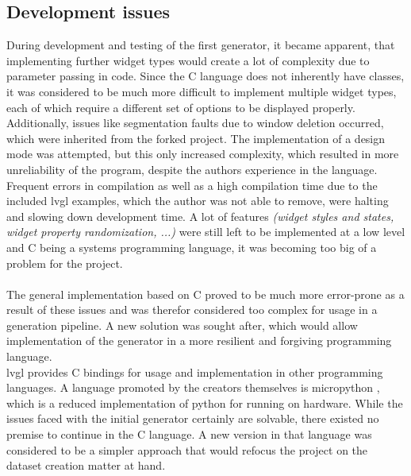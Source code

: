 \documentclass[Bachelor, BIC, english, fhCitStyle, IEEE]{BASE/twbook} %
\begin{document}
\subsection{Development issues}
During development and testing of the first generator, it became apparent, that implementing further widget types would create a lot of complexity due to parameter passing in code. Since the C language does not inherently have classes, it was considered to be much more difficult to implement multiple widget types, each of which require a different set of options to be displayed properly.\\
Additionally, issues like segmentation faults due to window deletion occurred, which were inherited from the forked project. The implementation of a design mode was attempted, but this only increased complexity, which resulted in more unreliability of the program, despite the authors experience in the language. Frequent errors in compilation as well as a high compilation time due to the included \ac{lvgl} examples, which the author was not able to remove, were halting and slowing down development time. A lot of features \textit{(widget styles and states, widget property randomization, ...)} were still left to be implemented at a low level and C being a systems programming language, it was becoming too big of a problem for the project.\\\\
The general implementation based on C proved to be much more error-prone as a result of these issues and was therefor considered too complex for usage in a generation pipeline. A new solution was sought after, which would allow implementation of the generator in a more resilient and forgiving programming language.\\
\ac{lvgl} provides C bindings \autocite{LvglLv_binding_micropythonLVGL} for usage and implementation in other programming languages. A language promoted by the creators themselves is micropython \autocite{LvglLv_micropythonMicropython}, which is a reduced implementation of python for running on hardware. While the issues faced with the initial generator certainly are solvable, there existed no premise to continue in the C language. A new version in that language was considered to be a simpler approach that would refocus the project on the dataset creation matter at hand.
\clearpage
\end{document}
